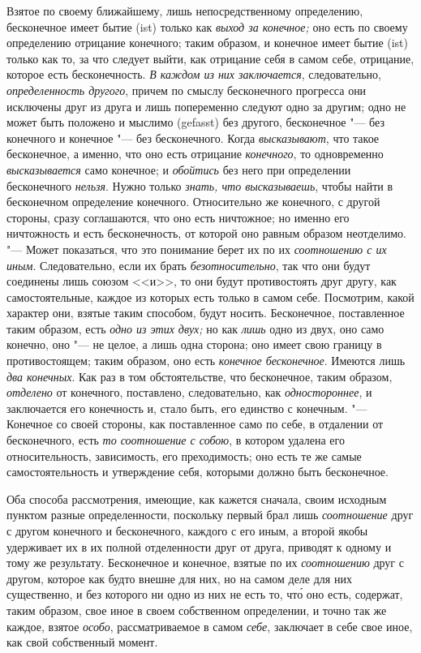 Взятое по своему ближайшему, лишь непосредственному определению, бесконечное
имеет бытие (ist) только как {\em выход за конечное;}
оно есть по своему определению отрицание конечного; таким образом, и
конечное имеет бытие (ist) только как то, за что следует выйти, как
отрицание себя в самом себе, отрицание, которое есть бесконечность.
{\em В каждом из них заключается}, следовательно,
{\em определенность другого}, причем по смыслу
бесконечного прогресса они исключены друг из друга и лишь попеременно
следуют одно за другим; одно не может быть положено и мыслимо (gefasst) без
другого, бесконечное "--- без конечного и конечное "--- без бесконечного. Когда
{\em высказывают}, что такое бесконечное, а именно, что
оно есть отрицание {\em конечного}, то одновременно
{\em высказывается} само конечное; и
{\em обойтись} без него при определении бесконечного
{\em нельзя}. Нужно только
{\em знать, что высказываешь}, чтобы найти в
бесконечном определение конечного. Относительно же конечного, с другой
стороны, сразу соглашаются, что оно есть ничтожное; но именно его
ничтожность и есть бесконечность, от которой оно равным образом неотделимо.
"--- Может показаться, что это понимание берет их по их
{\em соотношению с их иным}. Следовательно, если их
брать {\em безотносительно}, так что они будут
соединены лишь союзом <<и>>, то они будут противостоять друг другу, как
самостоятельные, каждое из которых есть только в самом себе. Посмотрим,
какой характер они, взятые таким способом, будут носить. Бесконечное,
поставленное таким образом, есть {\em одно из этих
двух;} но как {\em лишь} одно из двух, оно само
конечно, оно "--- не целое, а лишь одна сторона; оно имеет свою границу в
противостоящем; таким образом, оно есть {\em конечное
бесконечное}. Имеются лишь {\em два конечных}. Как раз
в том обстоятельстве, что бесконечное, таким образом,
{\em отделено} от конечного, поставлено, следовательно,
как {\em одностороннее}, и заключается его конечность
и, стало быть, его единство с конечным. "--- Конечное со своей стороны, как
поставленное само по себе, в отдалении от бесконечного, есть
{\em то соотношение с собою}, в котором удалена его
относительность, зависимость, его преходимость; оно есть те же самые
самостоятельность и утверждение себя, которыми должно быть бесконечное.

Оба способа рассмотрения, имеющие, как кажется сначала, своим исходным
пунктом разные определенности, поскольку первый брал лишь
{\em соотношение} друг с другом конечного и
бесконечного, каждого с его иным, а второй якобы удерживает их в их
полной отделенности друг от друга, приводят к одному и тому же результату.
Бесконечное и конечное, взятые по их {\em соотношению}
друг с другом, которое как будто внешне для них, но на самом деле для них
существенно, и без которого ни одно из них не есть то, чт\'{о} оно есть,
содержат, таким образом, свое иное в своем собственном определении, и
точно так же каждое, взятое {\em особо},
рассматриваемое в самом {\em себе}, заключает в себе
свое иное, как свой собственный момент.


